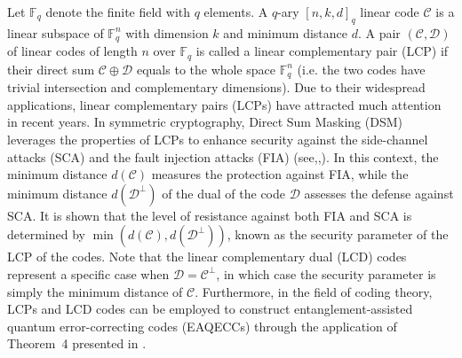 \documentclass[journal,12pt,onecolumn]{IEEEtran}
\begin{document}
Let $\mathbb{F}_q$ denote the finite field with $q$ elements. A $q$-ary $[n,k,d]_q$ linear code $\mathcal{C}$ is a linear subspace of $\mathbb{F}_q^n$ with dimension $k$ and minimum distance $d$. A pair $(\mathcal{C},\mathcal{D})$ of linear codes of length $n$ over $\mathbb{F}_q$ is called a linear complementary pair (LCP) \cite{carletLinearComplementaryPairs2018} if their direct sum $\mathcal{C}\oplus\mathcal{D}$ equals to the whole space $\mathbb{F}_q^n$ (i.e. the two codes have trivial intersection and complementary dimensions). Due to their widespread applications, linear complementary pairs (LCPs) have attracted much attention in recent years. In symmetric cryptography, Direct Sum Masking (DSM) leverages the properties of LCPs to enhance security against the side-channel attacks (SCA) and the fault injection attacks (FIA) (see\cite{Orthogonal_Direct_Sum_Masking},\cite{Side-Channel_Attacks},\cite{Linear_complementary_dual_code_improvement_to_strengthen_encoded_circui_tagainst_hardware_Trojan_horses}). In this context, the minimum distance $d(\mathcal{C})$ measures the protection against FIA, while the minimum distance $d(\mathcal{D}^\perp)$ of the dual of the code $\mathcal{D}$ assesses the defense against SCA. It is shown that the level of resistance against both FIA and SCA is determined by $\min(d(\mathcal{C}),d(\mathcal{D}^\perp))$, known as the security parameter of the LCP of the codes. Note that the linear complementary dual (LCD) codes represent a specific case when $\mathcal{D} = \mathcal{C}^\perp$, in which case the security parameter is simply the minimum distance of $\mathcal{C}$. Furthermore, in the field of coding theory, LCPs and LCD codes can be employed to construct entanglement-assisted quantum error-correcting codes (EAQECCs) through the application of Theorem~4 presented in \cite{galindoEntanglementassistedQuantumErrorcorrecting2019}.
\end{document}
